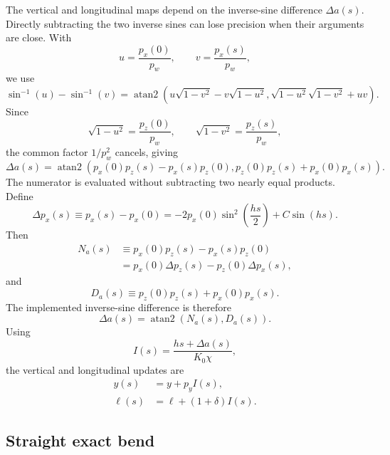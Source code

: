 The vertical and longitudinal maps depend on the inverse-sine difference
\(\Delta a(s)\). Directly subtracting the two inverse sines can lose precision
when their arguments are close. With
\begin{equation}
u=\frac{p_x(0)}{p_w}, \qquad v=\frac{p_x(s)}{p_w},
\end{equation}
we use
\begin{equation}
\sin^{-1}(u)-\sin^{-1}(v)
=
\operatorname{atan2}\left(
u\sqrt{1-v^2}-v\sqrt{1-u^2},
\sqrt{1-u^2}\sqrt{1-v^2}+uv
\right).
\end{equation}
Since
\begin{equation}
\sqrt{1-u^2}=\frac{p_z(0)}{p_w}, \qquad
\sqrt{1-v^2}=\frac{p_z(s)}{p_w},
\end{equation}
the common factor \(1/p_w^2\) cancels, giving
\begin{equation}
\Delta a(s)
=
\operatorname{atan2}
\left(
p_x(0)p_z(s)-p_x(s)p_z(0),
p_z(0)p_z(s)+p_x(0)p_x(s)
\right).
\end{equation}
The numerator is evaluated without subtracting two nearly equal products. Define
\begin{equation}
\Delta p_x(s) \equiv p_x(s)-p_x(0)
=
-2p_x(0)\sin^2\left(\frac{hs}{2}\right)+C\sin(hs).
\end{equation}
Then
\begin{align}
N_a(s)
&\equiv p_x(0)p_z(s)-p_x(s)p_z(0) \\
&= p_x(0)\Delta p_z(s)-p_z(0)\Delta p_x(s),
\end{align}
and
\begin{equation}
D_a(s) \equiv p_z(0)p_z(s)+p_x(0)p_x(s).
\end{equation}
The implemented inverse-sine difference is therefore
\begin{equation}
\Delta a(s)=\operatorname{atan2}\left(N_a(s),D_a(s)\right).
\end{equation}
Using
\begin{equation}
I(s)=\frac{hs+\Delta a(s)}{K_0\chi},
\end{equation}
the vertical and longitudinal updates are
\begin{align}
y(s) &= y + p_y I(s), \\
\ell(s) &= \ell + (1+\delta) I(s).
\end{align}

\subsection{Straight exact bend}

